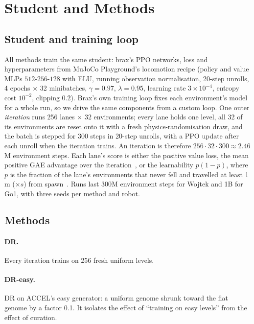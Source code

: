 \section{Student and Methods}
\label{sec:methods}

\subsection{Student and training loop}
All methods train the same student: brax's PPO
networks, loss and hyperparameters from MuJoCo Playground's locomotion
recipe (policy and value MLPs $512\text{-}256\text{-}128$ with ELU, running
observation normalisation, 20-step unrolls, 4 epochs $\times$ 32
minibatches, $\gamma=0.97$, $\lambda=0.95$, learning rate $3\times10^{-4}$,
entropy cost $10^{-2}$, clipping 0.2). Brax's own training loop fixes each
environment's model for a whole run, so we drive the same components from a
custom loop. One outer \emph{iteration} runs 256 lanes $\times$ 32
environments; every lane holds one level, all 32 of its environments are
reset onto it with a fresh physics-randomisation draw, and the batch is
stepped for 300 steps in 20-step unrolls, with a PPO update after each
unroll when the iteration trains. An iteration is therefore
$256\cdot32\cdot300\approx2.46$M environment steps. Each lane's score is
either the positive value loss, the mean positive GAE advantage over the
iteration~\citep{jiang2021plr}, or the learnability $p(1-p)$, where $p$ is
the fraction of the lane's environments that never fell and travelled at
least 1\,m ($\times s$) from spawn~\citep{rutherford2024noregrets}.
Runs last 300M environment steps for Wojtek and 1B for Go1, with three
seeds per method and robot.

\subsection{Methods}
\label{sec:methodlist}

\paragraph{DR.} Every iteration trains on 256 fresh uniform levels.

\paragraph{DR-easy.} DR on ACCEL's easy generator: a uniform genome shrunk
toward the flat genome by a factor 0.1. It isolates the effect of
``training on easy levels'' from the effect of curation.


